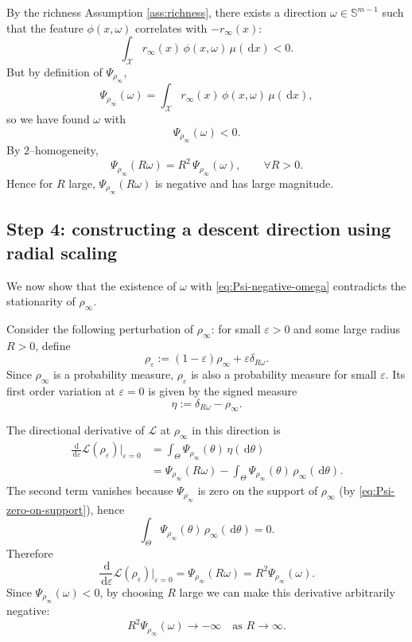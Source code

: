 \documentclass[11pt]{article}
\numberwithin{equation}{section}
\theoremstyle{definition}
\newcommand{\dd}{\,\mathrm{d}}
\newcommand{\1}{\mathbbm{1}}
\begin{document}
By the richness Assumption \ref{ass:richness}, there exists a direction $\omega\in\mathbb{S}^{m-1}$ such that the feature $\phi(x,\omega)$ correlates with $-r_\infty(x)$:
\begin{equation}
\int_{\mathcal{X}} r_\infty(x)\,\phi(x,\omega)\,\mu(\dd x) < 0.
\end{equation}
But by definition of $\Psi_{\rho_\infty}$,
\begin{equation}
\Psi_{\rho_\infty}(\omega)
= \int_{\mathcal{X}} r_\infty(x)\,\phi(x,\omega)\,\mu(\dd x),
\end{equation}
so we have found $\omega$ with
\begin{equation}
\label{eq:Psi-negative-omega}
\Psi_{\rho_\infty}(\omega) < 0.
\end{equation}
By $2$--homogeneity,
\begin{equation}
\Psi_{\rho_\infty}(R\omega) = R^2\,\Psi_{\rho_\infty}(\omega),
\qquad \forall R>0.
\end{equation}
Hence for $R$ large, $\Psi_{\rho_\infty}(R\omega)$ is negative and has large magnitude.

\subsection{Step 4: constructing a descent direction using radial scaling}

We now show that the existence of $\omega$ with \eqref{eq:Psi-negative-omega} contradicts the stationarity of $\rho_\infty$.

Consider the following perturbation of $\rho_\infty$: for small $\varepsilon>0$ and some large radius $R>0$, define
\[
\rho_{\varepsilon}
:= (1-\varepsilon)\rho_\infty + \varepsilon\delta_{R\omega}.
\]
Since $\rho_\infty$ is a probability measure, $\rho_\varepsilon$ is also a probability measure for small $\varepsilon$. Its first order variation at $\varepsilon=0$ is given by the signed measure
\[
\eta := \delta_{R\omega} - \rho_\infty.
\]

The directional derivative of $\mathcal{L}$ at $\rho_\infty$ in this direction is
\begin{align}
\frac{\dd}{\dd\varepsilon}\mathcal{L}(\rho_\varepsilon)\bigg|_{\varepsilon=0}
&= \int_\Theta \Psi_{\rho_\infty}(\theta)\,\eta(\dd\theta) \\
&= \Psi_{\rho_\infty}(R\omega) - \int_\Theta \Psi_{\rho_\infty}(\theta)\,\rho_\infty(\dd\theta).
\end{align}
The second term vanishes because $\Psi_{\rho_\infty}$ is zero on the support of $\rho_\infty$ (by \eqref{eq:Psi-zero-on-support}), hence
\[
\int_\Theta \Psi_{\rho_\infty}(\theta)\,\rho_\infty(\dd\theta)
= 0.
\]
Therefore
\begin{equation}
\label{eq:directional-derivative}
\frac{\dd}{\dd\varepsilon}\mathcal{L}(\rho_\varepsilon)\bigg|_{\varepsilon=0}
= \Psi_{\rho_\infty}(R\omega)
= R^2\Psi_{\rho_\infty}(\omega).
\end{equation}
Since $\Psi_{\rho_\infty}(\omega)<0$, by choosing $R$ large we can make this derivative arbitrarily negative:
\[
R^2\Psi_{\rho_\infty}(\omega) \to -\infty
\quad\text{as }R\to\infty.
\]
\end{document}
